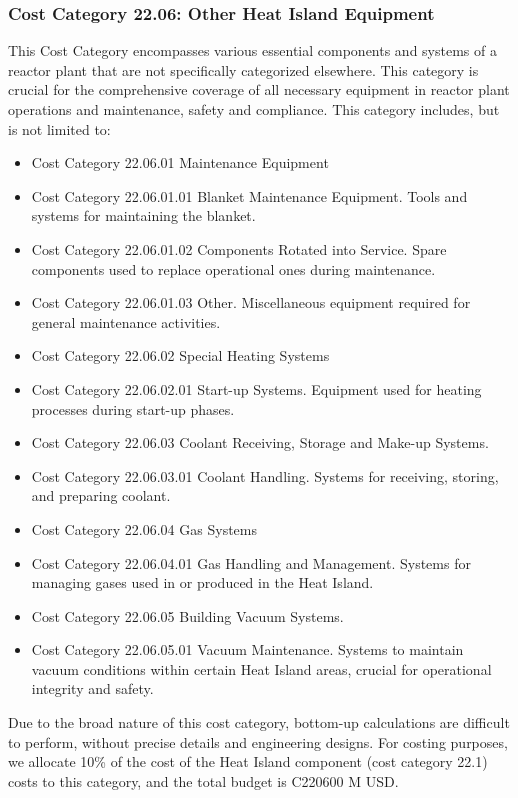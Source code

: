 
\subsubsection{Cost Category 22.06: Other Heat Island Equipment}

This Cost Category encompasses various essential components and systems of a reactor plant that are not specifically categorized elsewhere. This category is crucial for the comprehensive coverage of all necessary equipment in reactor plant operations and maintenance, safety and compliance.  This category includes, but is not limited to:


\begin{itemize}
    \item Cost Category 22.06.01 Maintenance Equipment
    \item Cost Category 22.06.01.01 Blanket Maintenance Equipment. Tools and systems for maintaining the blanket.
    \item Cost Category 22.06.01.02 Components Rotated into Service. Spare components used to replace operational ones during maintenance.
    \item Cost Category 22.06.01.03 Other. Miscellaneous equipment required for general maintenance activities.
    \item Cost Category 22.06.02 Special Heating Systems
    \item Cost Category 22.06.02.01 Start-up Systems. Equipment used for heating processes during start-up phases.
    \item Cost Category 22.06.03 Coolant Receiving, Storage and Make-up Systems.
    \item Cost Category 22.06.03.01 Coolant Handling. Systems for receiving, storing, and preparing coolant.
    \item Cost Category 22.06.04 Gas Systems
    \item Cost Category 22.06.04.01 Gas Handling and Management. Systems for managing gases used in or produced in the Heat Island.
    \item Cost Category 22.06.05 Building Vacuum Systems.
    \item Cost Category 22.06.05.01 Vacuum Maintenance. Systems to maintain vacuum conditions within certain Heat Island areas, crucial for operational integrity and safety.
\end{itemize}

Due to the broad nature of this cost category, bottom-up calculations are difficult to perform, without precise details and engineering designs. For costing purposes, we allocate 10\% of the cost of the Heat Island component (cost category 22.1) costs to this category, and the total budget is C220600 M USD.